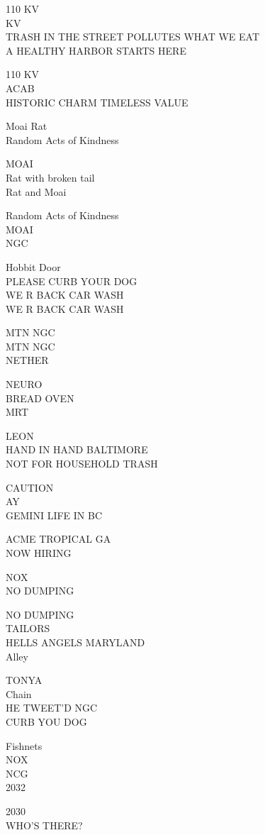 \documentclass[10pt,letterpaper]{article}
\begin{document}
110 KV\\
KV\\
TRASH IN THE STREET POLLUTES WHAT WE EAT\\
A HEALTHY HARBOR STARTS HERE

110 KV\\
ACAB\\
HISTORIC CHARM TIMELESS VALUE

Moai Rat\\
Random Acts of Kindness

MOAI\\
Rat with broken tail\\
Rat and Moai

Random Acts of Kindness\\
MOAI\\
NGC

Hobbit Door\\
PLEASE CURB YOUR DOG\\
WE R BACK CAR WASH\\
WE R BACK CAR WASH

MTN NGC\\
MTN NGC\\
NETHER

NEURO\\
BREAD OVEN\\
MRT

LEON\\
HAND IN HAND BALTIMORE\\
NOT FOR HOUSEHOLD TRASH

CAUTION\\
AY\\
GEMINI LIFE IN BC

ACME TROPICAL GA\\
NOW HIRING

NOX\\
NO DUMPING

NO DUMPING\\
TAILORS\\
HELLS ANGELS MARYLAND\\
Alley

TONYA\\
Chain\\
HE TWEET'D NGC\\
CURB YOU DOG

Fishnets\\
NOX\\
NCG\\
2032

2030\\
WHO'S THERE?
\end{document}
